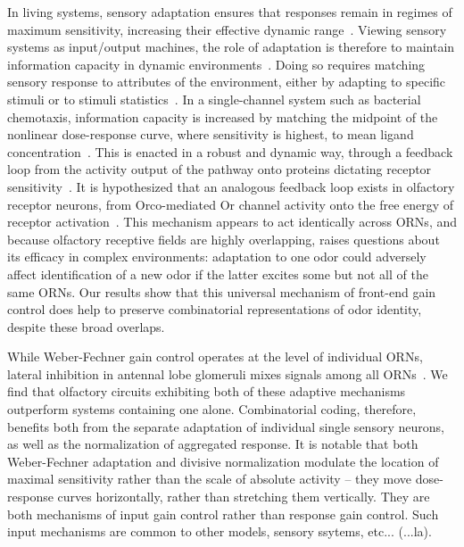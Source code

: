 \documentclass[9pt,twocolumn,twoside,lineno]{pnas-new}
\begin{document}
In living systems, sensory adaptation ensures that responses remain in regimes of maximum sensitivity, increasing their effective dynamic range~\cite{adaptation_fairhall, adaptation_nagel, laughlin, deweese_adaptation}. Viewing sensory systems as input/output machines, the role of adaptation is therefore to maintain information capacity in dynamic environments~\cite{information_theory_adaptation}. Doing so requires matching sensory response to attributes of the environment, either by adapting to specific stimuli or to stimuli statistics~\cite{adaptation_fairhall}. In a single-channel system such as bacterial chemotaxis, information capacity is increased by matching the midpoint of the nonlinear dose-response curve, where sensitivity is highest, to mean ligand concentration~\cite{information_theory_adaptation}. This is enacted in a robust and dynamic way, through a feedback loop from the activity output of the pathway onto proteins dictating receptor sensitivity~\cite{robustness_barkai, robustness_alon}. It is hypothesized that an analogous feedback loop exists in olfactory receptor neurons, from Orco-mediated Or channel activity onto the free energy of receptor activation~\cite{srinivas_elife}. This mechanism appears to act identically across ORNs, and because olfactory receptive fields are highly overlapping, raises questions about its efficacy in complex environments: adaptation to one odor could adversely affect identification of a new odor if the latter excites some but not all of the same ORNs. Our results show that this universal mechanism of front-end gain control does help to preserve combinatorial representations of odor identity, despite these broad overlaps. 

While Weber-Fechner gain control operates at the level of individual ORNs, lateral inhibition in antennal lobe glomeruli mixes signals among all ORNs~\cite{divisive_normalization}. We find that olfactory circuits exhibiting both of these adaptive mechanisms outperform systems containing one alone. 
Combinatorial coding, therefore, benefits both from the separate adaptation of individual single sensory neurons, as well as the normalization of aggregated response. It is notable that both Weber-Fechner adaptation and divisive normalization modulate the location of maximal sensitivity rather than the scale of absolute activity -- they move dose-response curves horizontally, rather than stretching them vertically. They are both mechanisms of input gain control rather than response gain control. {\color{blue} Such input mechanisms are common to other models, sensory ssytems, etc... (...la)}. 
\end{document}
